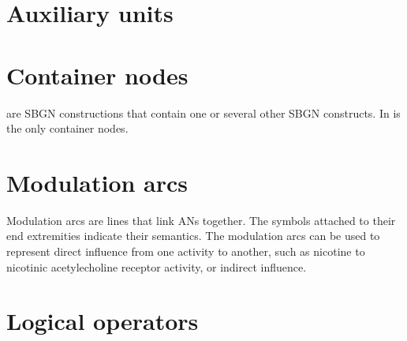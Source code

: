 




\section{Auxiliary units}\label{sec:af:AUs}




\section{Container nodes}
\label{sec:af:CNs}

 are SBGN constructions that contain one or several other SBGN constructs.  In \SBGNAFLone {} is the only container nodes.






\section{Modulation arcs}\label{sec:af:arcs}

Modulation arcs are lines that link ANs together.  The symbols attached to their end extremities indicate their semantics.  The modulation arcs can be used to represent direct influence from one activity to another, such as nicotine to nicotinic acetylecholine receptor activity, or indirect influence.











\section{Logical operators}\label{sec:af:logic}




 